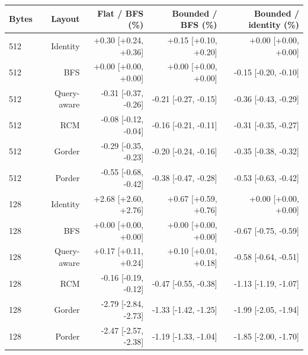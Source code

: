 \begin{tabular}{lrrrr}
\toprule
Bytes & Layout & Flat / BFS (\%) & Bounded / BFS (\%) & Bounded / identity (\%) \\
\midrule
512 & Identity & +0.30 [+0.24, +0.36] & +0.15 [+0.10, +0.20] & +0.00 [+0.00, +0.00] \\
512 & BFS & +0.00 [+0.00, +0.00] & +0.00 [+0.00, +0.00] & -0.15 [-0.20, -0.10] \\
512 & Query-aware & -0.31 [-0.37, -0.26] & -0.21 [-0.27, -0.15] & -0.36 [-0.43, -0.29] \\
512 & RCM & -0.08 [-0.12, -0.04] & -0.16 [-0.21, -0.11] & -0.31 [-0.35, -0.27] \\
512 & Gorder & -0.29 [-0.35, -0.23] & -0.20 [-0.24, -0.16] & -0.35 [-0.38, -0.32] \\
512 & Porder & -0.55 [-0.68, -0.42] & -0.38 [-0.47, -0.28] & -0.53 [-0.63, -0.42] \\
128 & Identity & +2.68 [+2.60, +2.76] & +0.67 [+0.59, +0.76] & +0.00 [+0.00, +0.00] \\
128 & BFS & +0.00 [+0.00, +0.00] & +0.00 [+0.00, +0.00] & -0.67 [-0.75, -0.59] \\
128 & Query-aware & +0.17 [+0.11, +0.24] & +0.10 [+0.01, +0.18] & -0.58 [-0.64, -0.51] \\
128 & RCM & -0.16 [-0.19, -0.12] & -0.47 [-0.55, -0.38] & -1.13 [-1.19, -1.07] \\
128 & Gorder & -2.79 [-2.84, -2.73] & -1.33 [-1.42, -1.25] & -1.99 [-2.05, -1.94] \\
128 & Porder & -2.47 [-2.57, -2.38] & -1.19 [-1.33, -1.04] & -1.85 [-2.00, -1.70] \\
\bottomrule
\end{tabular}

